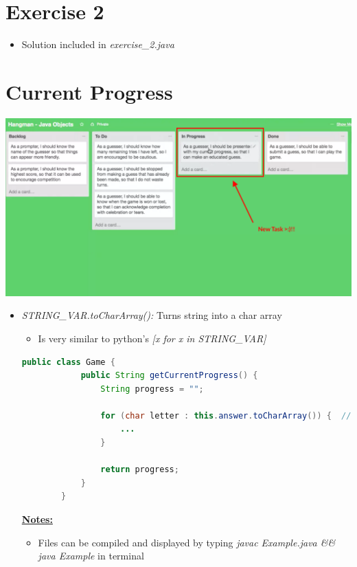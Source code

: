 \documentclass[12pt]{article}
\begin{document}
\bigskip

\section{Exercise 2}

\bigskip

\begin{itemize}
    \item Solution included in \textit{exercise\_2.java}
\end{itemize}

\bigskip

\section{Current Progress}

\bigskip

\begin{center}
\includegraphics[width=\linewidth]{images/part_3_notes_5.png}
\end{center}

\begin{itemize}
    \item \textit{STRING\_VAR.toCharArray():} Turns string into a char array
    \begin{itemize}
        \item Is very similar to python's \textit{[x for x in STRING\_VAR]}
    \end{itemize}

    \begin{lstlisting}[language=Java,caption={lesson\_09/Game.java}]
        public class Game {
            public String getCurrentProgress() {
                String progress = "";

                for (char letter : this.answer.toCharArray()) {  // 1. <- This little guy here :)
                    ...
                }

                return progress;
            }
        }
    \end{lstlisting}

    \bigskip

    \underline{\textbf{Notes:}}

    \bigskip

    \begin{itemize}
        \item Files can be compiled and displayed by typing \textit{javac Example.java \&\& java Example}
        in terminal
    \end{itemize}
\end{itemize}
\end{document}

